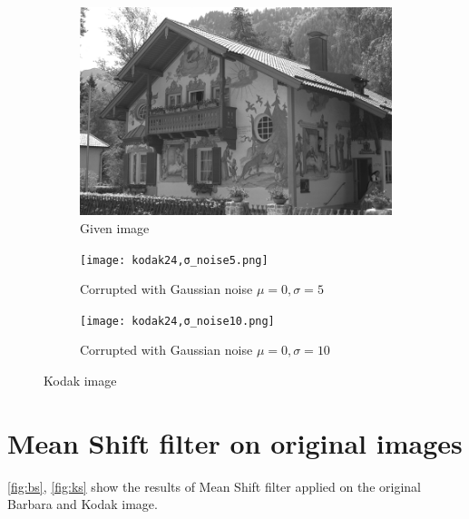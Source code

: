 \documentclass[a4paper, landscape]{article}
\begin{document}
\begin{figure}
    \centering
    \begin{subfigure}{0.33\linewidth}
        \centering
        \includegraphics[width=\linewidth]{kodak24.png}
        \caption{Given image}
    \end{subfigure}
    \begin{subfigure}{0.33\linewidth}
        \centering
        \texttt{[image: kodak24,σ\_noise5.png]}
        \caption{Corrupted with Gaussian noise $\mu=0, \sigma=5$}
    \end{subfigure}
    \begin{subfigure}{0.33\linewidth}
        \centering
        \texttt{[image: kodak24,σ\_noise10.png]}
        \caption{Corrupted with Gaussian noise $\mu=0, \sigma=10$}
    \end{subfigure}
    \caption{Kodak image}
    \label{fig:ko}
\end{figure}
\section{Mean Shift filter on original images}{\label{sec:bfo}}
\ref{fig:bs}, \ref{fig:ks} show the results of Mean Shift filter applied on the original Barbara and Kodak image.
\end{document}
